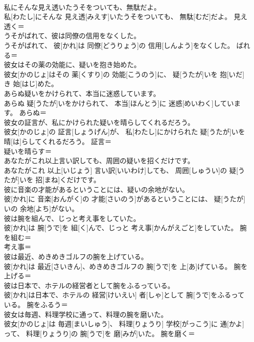 \documentclass[8pt]{extreport}
\begin{document}
\begin{CJK}{UTF8}{min}
\\	私にそんな見え透いたうそをついても、無駄だよ。	
\\	私[わたし]にそんな 見え透[みえす]いたうそをついても、 無駄[むだ]だよ。	見え透く＝ 
\\	うそがばれて、彼は同僚の信用をなくした。	
\\	うそがばれて、 彼[かれ]は 同僚[どうりょう]の 信用[しんよう]をなくした。	ばれる＝ 
\\	彼女はその薬の効能に、疑いを抱き始めた。	
\\	彼女[かのじょ]はその 薬[くすり]の 効能[こうのう]に、 疑[うたが]いを 抱[いだ]き 始[はじ]めた。	
\\	あらぬ疑いをかけられて、本当に迷惑しています。	
\\	あらぬ 疑[うたが]いをかけられて、 本当[ほんとう]に 迷惑[めいわく]しています。	あらぬ＝ 
\\	彼女の証言が、私にかけられた疑いを晴らしてくれるだろう。	
\\	彼女[かのじょ]の 証言[しょうげん]が、 私[わたし]にかけられた 疑[うたが]いを 晴[は]らしてくれるだろう。	証言＝ 
\\	疑いを晴らす＝ 
\\	あなたがこれ以上言い訳しても、周囲の疑いを招くだけです。	
\\	あなたがこれ 以上[いじょう] 言い訳[いいわけ]しても、 周囲[しゅうい]の 疑[うたが]いを 招[まね]くだけです。	
\\	彼に音楽の才能があるということには、疑いの余地がない。	
\\	彼[かれ]に 音楽[おんがく]の 才能[さいのう]があるということには、 疑[うたが]いの 余地[よち]がない。	
\\	彼は腕を組んで、じっと考え事をしていた。	
\\	彼[かれ]は 腕[うで]を 組[く]んで、じっと 考え事[かんがえごと]をしていた。	腕を組む＝ 
\\	考え事＝ 
\\	彼は最近、めきめきゴルフの腕を上げている。	
\\	彼[かれ]は 最近[さいきん]、めきめきゴルフの 腕[うで]を 上[あ]げている。	腕を上げる＝ 
\\	彼は日本で、ホテルの経営者として腕をふるっている。	
\\	彼[かれ]は日本で、ホテルの 経営[けいえい] 者[しゃ]として 腕[うで]をふるっている。	腕をふるう＝ 
\\	彼女は毎週、料理学校に通って、料理の腕を磨いた。	
\\	彼女[かのじょ]は 毎週[まいしゅう]、 料理[りょうり] 学校[がっこう]に 通[かよ]って、 料理[りょうり]の 腕[うで]を 磨[みが]いた。	腕を磨く＝ 

\end{CJK}
\end{document}
